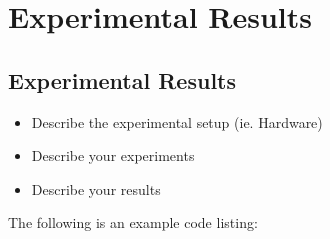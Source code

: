 
\glsresetall %
\chapter[Results]{Experimental Results}\label{ch:Experimental Results}

\section[Results]{Experimental Results}
\begin{itemize}
	\item{Describe the experimental setup (ie. Hardware)}
	\item{Describe your experiments}
	\item{Describe your results}
\end{itemize}


\clearpage

The following is an example code listing:


\lstset{language=python}
\lstset{tabsize=4}
\lstset{frame=single}
\lstset{label = ls.testPlot}
\lstset{caption = Test Plot Code }
{\tiny }

\lstset{language=C}

